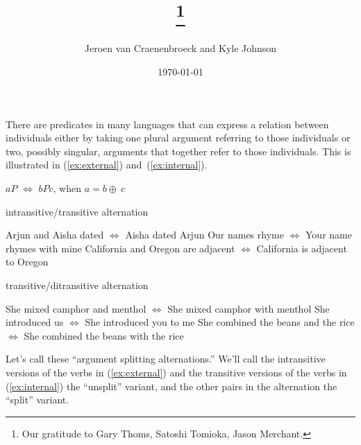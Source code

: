 \documentclass[twoside, 12pt]{article}
\title{\paper\thanks{Our gratitude to Gary Thoms, Satoshi Tomioka, Jason Merchant.}}
\author{Jeroen van Craenenbroeck and Kyle Johnson}
\date{\today}
\begin{document}
\raggedbottom
\begin{titlepage} 
\maketitle 
\thispagestyle{empty}
\begin{abstract}

 \noindent 
 
 \end{abstract}
 \end{titlepage} 

\thispagestyle{empty}
\noindent
There are predicates in many languages that can express a relation between individuals either by taking one plural argument referring to those individuals or two, possibly singular, arguments that together refer to those individuals. This is illustrated in (\ref{ex:external}) and~(\ref{ex:internal}).
\begin{exe}
\raggedright
\ex \label{ex:plainsymm} $aP$ $\Leftrightarrow$ $bPc$, when $a = b \oplus\ c$
\begin{xlist}
  \ex \label{ex:external} intransitive/transitive alternation
  \begin{xlist}
    \ex Arjun and Aisha dated $\Leftrightarrow$ Aisha dated Arjun
    \ex Our names rhyme $\Leftrightarrow$ Your name rhymes with mine
    \ex California and Oregon are adjacent $\Leftrightarrow$ California is adjacent to Oregon
  \end{xlist}
  \ex \label{ex:internal} transitive/ditransitive alternation
  \begin{xlist}
    \ex She mixed camphor and menthol $\Leftrightarrow$ She mixed camphor with menthol
    \ex She introduced us $\Leftrightarrow$ She introduced you to me
    \ex She combined the beans and the rice $\Leftrightarrow$ She combined the beans with the rice
  \end{xlist}
\end{xlist}
\end{exe}
Let's call these ``argument splitting alternations.'' We'll call the intransitive versions of the verbs in (\ref{ex:external}) and the transitive versions of the verbs in (\ref{ex:internal}) the ``unsplit'' variant, and the other pairs in the alternation the ``split'' variant.
\end{document}
